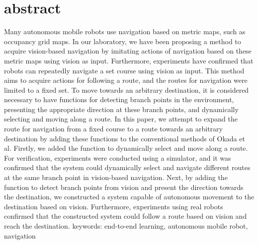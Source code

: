 \chapter*{abstract}
\thispagestyle{empty}
%
\begin{center}
  \scalebox{1.3}{title}
\end{center}
\vspace{1.0zh}
Many autonomous mobile robots use navigation based on metric maps, such as 
occupancy grid maps. In our laboratory, we have been proposing a method to 
acquire vision-based navigation by imitating actions of navigation based on these 
metric maps using vision as input. Furthermore, experiments have confirmed that robots 
can repeatedly navigate a set course using vision as input. 
This method aims to acquire actions for following a route, and the 
routes for navigation were limited to a fixed set. To move towards an 
arbitrary destination, it is considered necessary to have functions for 
detecting branch points in the environment, 
presenting the appropriate direction at these branch points, and dynamically 
selecting and moving along a route.
In this paper, we attempt to expand the route for navigation from a fixed 
course to a route towards an arbitrary destination by adding these functions to 
the conventional methods of Okada et al. Firstly, we added the function to dynamically 
select and move along a route. For verification, experiments were conducted using a simulator, 
and it was confirmed that the system could dynamically select and navigate different routes at the same branch point in vision-based navigation. 
Next, by adding the function to detect branch points from vision and present the direction towards the destination, we constructed a system capable of 
autonomous movement to the destination based on vision. Furthermore, experiments using real robots confirmed that the constructed system could follow a 
route based on vision and reach the destination.
keywords: end-to-end learning, autonomous mobile robot, navigation